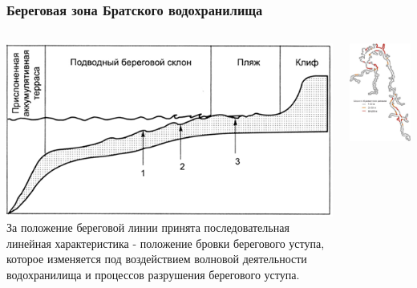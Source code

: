 \documentclass[10pt]{beamer}
\begin{document}
\begin{frame}[fragile]
  \frametitle{Береговая зона Братского водохранилища}
  \begin{columns}
    \begin{column}{0.5\linewidth}
      \includegraphics[width=\linewidth]{shore-struct-base.png}
      За положение береговой линии
принята последовательная линейная характеристика - положение бровки берегового уступа,  которое изменяется под воздействием волновой деятельности водохранилища и процессов разрушения берегового уступа.
    \end{column}
    \begin{column}{0.5\linewidth}
      \includegraphics[width=\linewidth]{bratsk-reserv-shores.jpeg}

\end{column}
\end{columns}
\end{frame}
\end{document}
